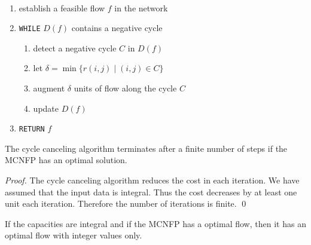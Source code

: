 \begin{algorithm}
  \label{alg:c1}
  ~\\
  \begin{enumerate}
  \item  establish a feasible flow $f$ in the network
  \item {\tt WHILE} $D(f)$ contains a negative cycle
    \begin{enumerate}
    \item  detect a negative cycle $C$ in $D(f)$
    \item let $\delta=\min\{r{(i,j)} \mid (i,j) \in C\}$
    \item augment $\delta$ units of flow along the cycle $C$
    \item update $D(f)$
    \end{enumerate}
  \item {\tt RETURN}  $f$
  \end{enumerate}
\end{algorithm}




  \begin{theorem}
    \label{f:thr:12}
    The cycle canceling algorithm terminates after a finite number of
    steps if the MCNFP has an optimal solution. 
  \end{theorem}
  \begin{proof}   
  The cycle canceling algorithm reduces the cost in each iteration.
  We have assumed that the input data is integral. Thus the cost
  decreases by at least one unit each iteration. 
  Therefore the number of iterations is finite.    
  \qed
\end{proof}


\begin{corollary}
  \label{co:3}
  If the capacities are  integral and if the MCNFP has a optimal flow, then
  it has an optimal flow with integer values only. 
\end{corollary}




    

